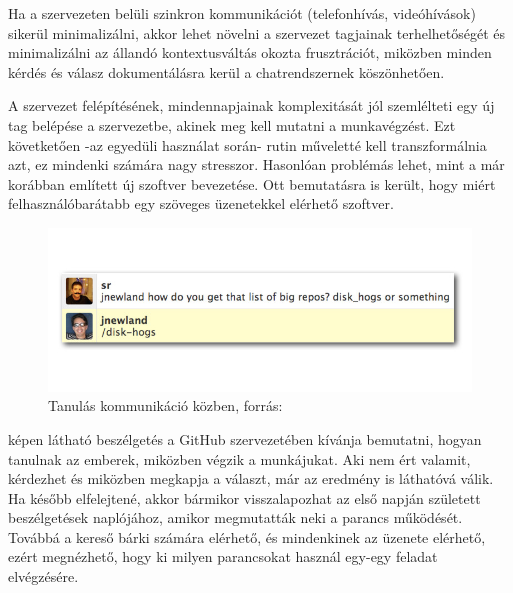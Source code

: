 Ha a szervezeten belüli szinkron kommunikációt (telefonhívás, videóhívások) sikerül minimalizálni, akkor lehet növelni a szervezet tagjainak terhelhetőségét és minimalizálni az állandó kontextusváltás okozta frusztrációt, miközben minden kérdés és válasz dokumentálásra kerül a chatrendszernek köszönhetően.

A szervezet felépítésének, mindennapjainak komplexitását jól szemlélteti egy új tag belépése a szervezetbe, akinek meg kell mutatni a munkavégzést. Ezt követketően -az egyedüli használat során- rutin műveletté kell transzformálnia azt, ez mindenki számára nagy stresszor. Hasonlóan problémás lehet, mint a már korábban említett új szoftver bevezetése. Ott bemutatásra is került, hogy miért felhasználóbarátabb egy szöveges üzenetekkel elérhető szoftver.

\begin{figure}[ht]
  \centering
    \includegraphics[scale=.6]{assets/github_disk_how_is_it.png}%
    \caption[DUMMY]%
    {Tanulás kommunikáció közben, forrás: \cite[p.~65]{what_is_chatops_slideshow}}%
    \label{fig:learn_by_doing}
\end{figure}

 képen látható beszélgetés a GitHub szervezetében kívánja bemutatni, hogyan tanulnak az emberek, miközben végzik a munkájukat. Aki nem ért valamit, kérdezhet és miközben megkapja a választ, már az eredmény is láthatóvá válik. Ha később elfelejtené, akkor bármikor visszalapozhat az első napján született beszélgetések naplójához, amikor megmutatták neki a parancs működését. Továbbá a kereső bárki számára elérhető, és mindenkinek az üzenete elérhető, ezért megnézhető, hogy ki milyen parancsokat használ egy-egy feladat elvégzésére.

